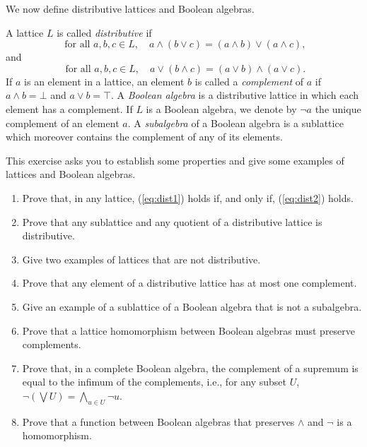We now define distributive lattices and Boolean algebras.
\begin{definition}
A lattice $L$ is called \emph{distributive} if
\begin{equation}\label{eq:dist1}
\text{ for all } a, b, c \in L, \quad a \wedge (b \vee c) = (a \wedge b) \vee (a \wedge c),
\end{equation}
and
\begin{equation} \label{eq:dist2}
  \text{ for all } a, b, c \in L, \quad a \vee (b \wedge c) = (a \vee b) \wedge (a \vee c).
\end{equation}
  If $a$ is an element in a lattice, an element $b$ is called a \emph{complement} of $a$ if $a \wedge b = \bot$ and $a \vee b = \top$. A \emph{Boolean algebra} is a distributive lattice in which each element has a complement. If $L$ is a Boolean algebra, we denote by $\neg a$ the unique complement of an element $a$. A \emph{subalgebra} of a Boolean algebra is a sublattice which moreover contains the complement of any of its elements.
  \end{definition}


\begin{exercise}\easy \label{exe:latticebasics} This exercise asks you to establish some properties and give some examples of lattices and Boolean algebras.
  \begin{enumerate}
  \item Prove that, in any lattice, (\ref{eq:dist1}) holds if, and only if, (\ref{eq:dist2}) holds.
  \item Prove that any sublattice and any quotient of a distributive lattice is distributive.
  \item Give two examples of lattices that are not distributive.
  \item  Prove that any element of a distributive lattice has at most one complement.
  \item Give an example of a sublattice of a Boolean algebra that is not a subalgebra.
  \item Prove that a lattice homomorphism between Boolean algebras must preserve complements.
  \item Prove that, in a complete Boolean algebra, the complement of a supremum is equal to the infimum of the complements, i.e., for any subset $U$, $\neg(\bigvee U) = \bigwedge_{u \in U} \neg u$.
  \item Prove that a function between Boolean algebras that preserves $\wedge$ and $\neg$ is a homomorphism.
   \end{enumerate}
 \end{exercise}
 

